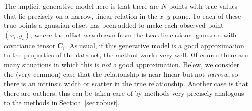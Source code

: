 \documentclass[12pt]{article}
\newcommand{\sectionname}{Section}
\newcommand{\mmatrix}[1]{\boldsymbol{#1}}
\newcommand{\mC}{\mmatrix{C}}
\begin{document}
The implicit generative model here is that there are $N$ points with
true values that lie precisely on a narrow, linear relation in the
$x$--$y$ plane.  To each of these true points a gaussian offset has
been added to make each observed point $(x_i,y_i)$, where the offset
was drawn from the two-dimensional gaussian with covariance tensor
$\mC_i$.  As usual, if this generative model is a good approximation
to the properties of the data set, the method works very well.  Of
course there are many situations in which this is \emph{not} a good
approximation.  Below, we consider the (very common) case that the
relationship is near-linear but not \emph{narrow}, so there is an
intrinsic width or scatter in the true relationship.  Another case is
that there are outliers; this can be taken care of by methods very
precisely analogous to the methods in \sectionname~\ref{sec:robust}.
\end{document}
